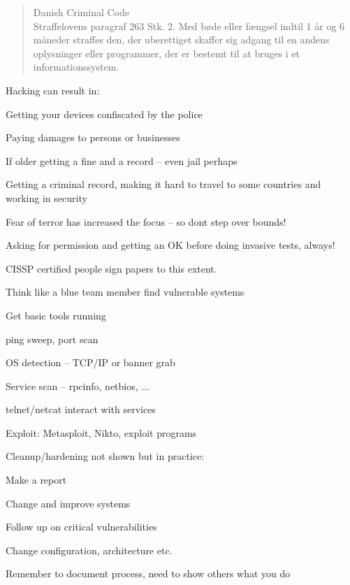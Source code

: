 \documentclass[Screen16to9,17pt]{foils}
\begin{document}
\begin{quote}\small
Danish Criminal Code\\
Straffelovens paragraf 263 Stk. 2. Med bøde eller fængsel indtil 1 år og 6 måneder straffes den, der uberettiget skaffer sig adgang til en andens oplysninger eller programmer, der er bestemt til at bruges i et informationssystem.
\end{quote}

Hacking can result in:
\begin{list2}
\item Getting your devices confiscated by the police
\item Paying damages to persons or businesses
\item If older getting a fine and a record -- even jail perhaps
\item Getting a criminal record, making it hard to travel to some countries and working in security
\item Fear of terror has increased the focus -- so dont step over bounds!
\end{list2}

Asking for permission and getting an OK before doing invasive tests, always!



CISSP certified people sign papers to this extent.\\



\begin{list1}
\item Think like a blue team member find vulnerable systems
\item Get basic tools running
\begin{list2}
\item ping sweep, port scan
\item OS detection -- TCP/IP or banner grab
\item Service scan -- rpcinfo, netbios, ...
\item telnet/netcat interact with services
\end{list2}
\item Exploit: Metasploit, Nikto, exploit programs
\item Cleanup/hardening not shown but in practice:
\begin{list2}
\item Make a report
\item Change and improve systems
\item Follow up on critical vulnerabilities
\item Change configuration, architecture etc.
\end{list2}
\item Remember to document process, need to show others what you do
\end{list1}
\end{document}
